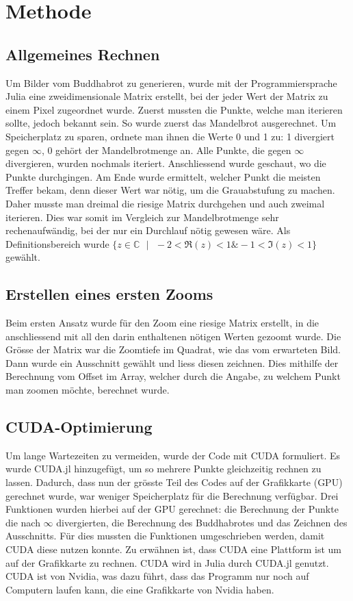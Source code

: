 \section{Methode}
\subsection{Allgemeines Rechnen}
Um Bilder vom Buddhabrot zu generieren, wurde mit der Programmiersprache Julia eine zweidimensionale Matrix erstellt, bei der jeder Wert der Matrix zu einem Pixel zugeordnet wurde. Zuerst mussten die Punkte, welche man iterieren sollte, jedoch bekannt sein. So wurde zuerst das Mandelbrot ausgerechnet. Um Speicherplatz zu sparen, ordnete man ihnen die Werte 0 und 1 zu: 1 divergiert gegen $\infty$, 0 gehört der Mandelbrotmenge an. Alle Punkte, die gegen $\infty$ divergieren, wurden nochmals iteriert. Anschliessend wurde geschaut, wo die Punkte durchgingen. Am Ende wurde ermittelt, welcher Punkt die meisten Treffer bekam, denn dieser Wert war nötig, um die Grauabstufung zu machen. Daher musste man dreimal die riesige Matrix durchgehen und auch zweimal iterieren. Dies war somit im Vergleich zur Mandelbrotmenge sehr rechenaufwändig, bei der nur ein Durchlauf nötig gewesen wäre. Als Definitionsbereich wurde $\{z \in \mathbb{C}\text{ }|\text{ }-2 < \Re(z) < 1 \& -1 < \Im(z) < 1\}$ gewählt.
\subsection{Erstellen eines ersten Zooms}
Beim ersten Ansatz wurde für den Zoom eine riesige Matrix erstellt, in die anschliessend mit all den darin enthaltenen nötigen Werten gezoomt wurde. Die Grösse der Matrix war die Zoomtiefe im Quadrat, wie das vom erwarteten Bild. Dann wurde ein Ausschnitt gewählt und liess diesen zeichnen. Dies mithilfe der Berechnung vom Offset im Array, welcher durch die Angabe, zu welchem Punkt man zoomen möchte, berechnet wurde.
\subsection{CUDA-Optimierung}
Um lange Wartezeiten zu vermeiden, wurde der Code mit CUDA formuliert. Es wurde CUDA.jl hinzugefügt, um so mehrere Punkte gleichzeitig rechnen zu lassen. Dadurch, dass nun der grösste Teil des Codes auf der Grafikkarte (GPU) gerechnet wurde, war weniger Speicherplatz für die Berechnung verfügbar. Drei Funktionen wurden hierbei auf der GPU gerechnet: die Berechnung der Punkte die nach $\infty$ divergierten, die Berechnung des Buddhabrotes und das Zeichnen des Ausschnitts. Für dies mussten die Funktionen umgeschrieben werden, damit CUDA diese nutzen konnte. Zu erwähnen ist, dass CUDA eine Plattform ist um auf der Grafikkarte zu rechnen. CUDA wird in Julia durch CUDA.jl genutzt. CUDA ist von Nvidia, was dazu führt, dass das Programm nur noch auf Computern laufen kann, die eine Grafikkarte von Nvidia haben.
